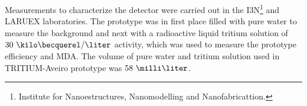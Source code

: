 Measurements to characterize the detector were carried out in the I3N\footnote{Institute for Nanoestructures, Nanomodelling and Nanofabricattion.} and LARUEX laboratories. The prototype was in first place filled with pure water to measure the background and next with a radioactive liquid tritium solution of $30~\kilo\becquerel/\liter$ activity, which was used to measure the prototype efficiency and MDA. The volume of pure water and tritium solution used in TRITIUM-Aveiro prototype was $58~\milli\liter$. 







